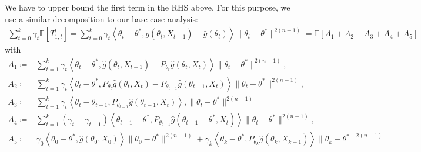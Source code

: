 \documentclass[a4paper]{article}
\newcommand{\norm}[1]{\|#1 \|}
\newcommand{\Exs}{\mathbb{E}}
\newcommand{\thetastar}{\theta^*}
\newcommand{\constTprime}[1]{T_{#1}^{\prime}}
\begin{document}
We have to upper bound the first term in the RHS above. For this purpose, we use a similar decomposition to our base case analysis:
\begin{align*}
	\sum_{t = 0}^{k}\gamma_{t}\Exs\left[\constTprime{1, t}\right] = \sum_{t = 0}^{k}\gamma_{t}\left\langle \theta_{t} - \thetastar, g\left(\theta_{t}, X_{t + 1}\right) - \bar{g}\left(\theta_{t}\right)\right\rangle\norm{\theta_{t} - \thetastar}^{2(n - 1)} = \Exs\left[ A_{1} + A_{2} + A_{3} + A_{4} + A_{5}\right]
\end{align*} 
with
\begin{align*}
	A_{1} \coloneq & \sum_{t = 1}^{k}\gamma_{t}\left\langle \theta_{t} - \thetastar, \hat{g}\left(\theta_{t}, X_{t + 1}\right) - P_{\theta_{t}}\hat{g}\left(\theta_{t}, X_{t}\right) \right\rangle\norm{\theta_{t} - \thetastar}^{2(n - 1)},\\
	A_{2} \coloneq & \sum_{t = 1}^{k}\gamma_{t}\left\langle \theta_{t} - \thetastar, P_{\theta_{t}}\hat{g}\left(\theta_{t}, X_{t}\right) - P_{\theta_{t - 1}}\hat{g}\left( \theta_{t - 1}, X_{t} \right) \right\rangle\norm{\theta_{t} - \thetastar}^{2(n - 1)},\\
	A_{3} \coloneq & \sum_{t = 1}^{k}\gamma_{t}\left\langle \theta_{t} - \theta_{t - 1}, P_{\theta_{t - 1}}\hat{g}\left( \theta_{t - 1}, X_{t}\right) \right\rangle,\norm{\theta_{t} - \thetastar}^{2(n - 1)}\\
	A_{4} \coloneq & \sum_{t = 1}^{k}\left(\gamma_{t} - \gamma_{t - 1}\right)\left\langle \theta_{t - 1} - \thetastar, P_{\theta_{t - 1}}\hat{g}\left( \theta_{t - 1} - \thetastar, X_{t}\right) \right\rangle\norm{\theta_{t} - \thetastar}^{2(n - 1)},\\
	A_{5} \coloneq & \gamma_{0}\left\langle \theta_{0} - \thetastar, \hat{g}\left(\theta_{0}, X_{0}\right) \right\rangle\norm{\theta_{0} - \thetastar}^{2(n - 1)} + \gamma_{k}\left\langle \theta_{k} - \thetastar, P_{\theta_{k}}\hat{g}\left(\theta_{k}, X_{k + 1}\right)\right\rangle\norm{\theta_{k} - \thetastar}^{2(n - 1)}
\end{align*}



\end{document}
